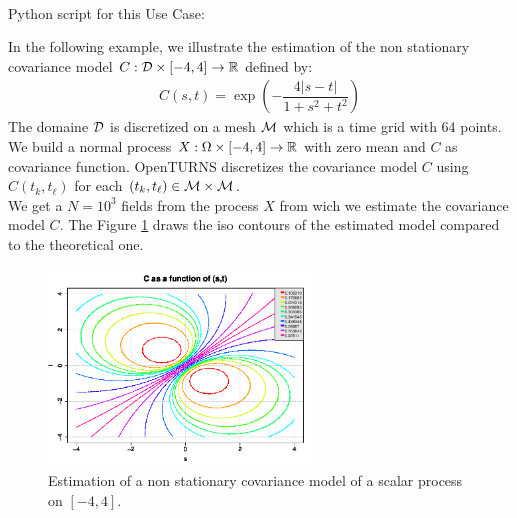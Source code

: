 \textspace\\
Python script for this Use Case:


In the following example, we illustrate the estimation of the non stationary covariance model $C : {\mathcal D} \times [-4, 4] \rightarrow  {\mathbb R} $ defined by:
\begin{align}
  \displaystyle C(s,t) = \exp\left(-\dfrac{4|s-t|}{1+s^2+t^2}\right)
\end{align}
The domaine ${\mathcal D}$ is  discretized on a mesh ${\mathcal M}$ which is a time grid with 64 points.\\
We build a normal process $X: \Omega \times [-4, 4]  \rightarrow {\mathbb R}$ with zero mean and $C$ as covariance function. OpenTURNS discretizes the covariance model $C$ using $C(t_k, t_\ell)$ for each $(t_k, t_\ell)\in {\mathcal M} \times {\mathcal M}$.\\
We get a $N=10^3$ fields from the process $X$ from wich we estimate the covariance model $C$. The Figure \ref{NonStatCovEstim} draws the iso contours of the estimated model compared to the theoretical one.


\begin{figure}[H]
  \begin{center}
    \includegraphics[width=7cm]{Figures/NonStatCovFuncEstim.png}
    \caption{Estimation of a non stationary covariance model of a scalar process on $[-4, 4]$.}
    \label{NonStatCovEstim}
  \end{center}
\end{figure}
